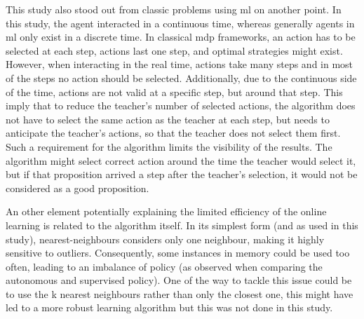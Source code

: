 This study also stood out from classic problems using \gls{ml} on another point. In this study, the agent interacted in a continuous time, whereas generally agents in \gls{ml} only exist in a discrete time. In classical \gls{mdp} frameworks, an action has to be selected at each step, actions last one step, and optimal strategies might exist. However, when interacting in the real time, actions take many steps and in most of the steps no action should be selected. Additionally, due to the continuous side of the time, actions are not valid at a specific step, but around that step. This imply that to reduce the teacher's number of selected actions, the algorithm does not have to select the same action as the teacher at each step, but needs to anticipate the teacher's actions, so that the teacher does not select them first. Such a requirement for the algorithm limits the visibility of the results. The algorithm might select correct action around the time the teacher would select it, but if that proposition arrived a step after the teacher's selection, it would not be considered as a good proposition.

An other element potentially explaining the limited efficiency of the online learning is related to the algorithm itself. In its simplest form (and as used in this study), nearest-neighbours considers only one neighbour, making it highly sensitive to outliers. Consequently, some instances in memory could be used too often, leading to an imbalance of policy (as observed when comparing the autonomous and supervised policy). One of the way to tackle this issue could be to use the k nearest neighbours rather than only the closest one, this might have led to a more robust learning algorithm but this was not done in this study.


